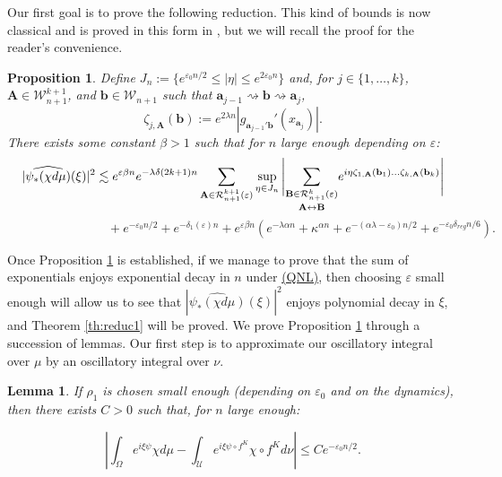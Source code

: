 \documentclass[a4paper]{article}
\newtheorem{lemma}[theorem]{Lemma}
\newtheorem{proposition}[theorem]{Proposition}
\theoremstyle{definition}
\begin{document}
Our first goal is to prove the following reduction. This kind of bounds is now classical \cite{BD17,LNP19,SS20,Le21} and is proved in this form in \cite{Le24,Le23a}, but we will recall the proof for the reader's convenience.
\begin{proposition}\label{prop:reduc}
Define $J_n := \{ e^{\varepsilon_0 n/2} \leq |\eta| \leq  e^{2 \varepsilon_0 n} \}$ and, for $j \in \{1, \dots, k\}$, $\mathbf{A} \in \mathcal{W}_{n+1}^{k+1}$, and $\mathbf{b} \in \mathcal{W}_{n+1}$ such that $\textbf{a}_{j-1} \rightsquigarrow \textbf{b} \rightsquigarrow \textbf{a}_j$, $$  \zeta_{j,\mathbf{A}}(\mathbf{b}) := e^{2 \lambda n} |g_{\mathbf{a}_{j-1}' \mathbf{b}}'(x_{\mathbf{a}_j})| .$$
There exists some constant $\beta>1$ such that for $n$ large enough depending on $\varepsilon$:
$$ |\widehat{\psi_*(\chi d\mu)}(\xi)|^2 \lesssim e^{ \varepsilon \beta n} e^{-\lambda \delta (2k+1) n} \sum_{\mathbf{A} \in \mathcal{R}_{n+1}^{k+1}(\varepsilon)} \sup_{\eta \in J_n} \Bigg{|} \underset{\mathbf{A} \leftrightarrow \mathbf{B}}{\sum_{\mathbf{B} \in \mathcal{R}_{n+1}^k(\varepsilon)}} e^{i \eta \zeta_{1,\mathbf{A}}(\mathbf{b}_1) \dots \zeta_{k,\mathbf{A}}(\mathbf{b}_k) } \Bigg| $$
$$ \quad \quad  \quad \quad  \quad \quad  \quad \quad + e^{-  \varepsilon_0 n/2} +  e^{-\delta_1(\varepsilon) n} + e^{\varepsilon \beta n} \left( e^{- \lambda \alpha n} +  \kappa^{\alpha n} + e^{-(\alpha \lambda-\varepsilon_0) n/2} + e^{- \varepsilon_0 \delta_{reg}n/6} \right).$$
\end{proposition}


Once Proposition \ref{prop:reduc} is established, if we manage to prove that the sum of exponentials enjoys exponential decay in $n$ under \hyperref[QNL]{(QNL)}, then choosing $\varepsilon$ small enough will allow us to see that $|\widehat{\psi_*(\chi d\mu)}(\xi)|^2$ enjoys polynomial decay in $\xi$, and Theorem \ref{th:reduc1} will be proved. We prove Proposition \ref{prop:reduc} through a succession of lemmas. Our first step is to approximate our oscillatory integral over $\mu$ by an oscillatory integral over $\nu$.


\begin{lemma}\label{lem:step1}
If $\rho_1$ is chosen small enough (depending on $\varepsilon_0$ and on the dynamics), then there exists $C>0$ such that, for $n$ large enough:

$$ \left| \int_{\Omega} e^{i \xi \psi} \chi d\mu - \int_{\mathcal{U}} e^{ i \xi \psi \circ f^K} \chi \circ f^K d \nu \right| \leq C e^{- \varepsilon_0 n/2} .$$
\end{lemma}
\end{document}
